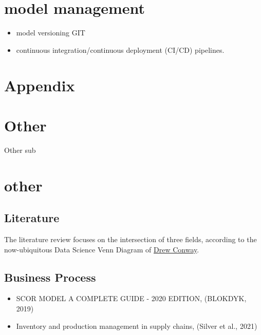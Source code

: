\documentclass[
  american,
  10,
  a4paper,
]{book}
\providecommand{\tightlist}{%
  \setlength{\itemsep}{0pt}\setlength{\parskip}{0pt}}
\theoremstyle{definition}
\theoremstyle{remark}
\begin{document}
\chapter{model management}\label{model-management}

\begin{itemize}
\tightlist
\item
  model versioning GIT
\item
  continuous integration/continuous deployment (CI/CD) pipelines.
\end{itemize}

\chapter*{Appendix}\label{appendix-3}


\chapter{Other}\label{other}

Other sub

\hfill\break

\chapter*{other}\label{other-1}


\section{Literature}\label{sec-literature_review}

The literature review focuses on the intersection of three fields,
according to the now-ubiquitous Data Science Venn Diagram of
\href{http://drewconway.com/zia/2013/3/26/the-data-science-venn-diagram}{Drew
Conway}.

\section{Business Process}\label{business-process}

\begin{itemize}
\tightlist
\item
  SCOR MODEL A COMPLETE GUIDE - 2020 EDITION, (BLOKDYK, 2019)
\item
  Inventory and production management in supply chains, (Silver et al.,
  2021)
\end{itemize}
\end{document}
